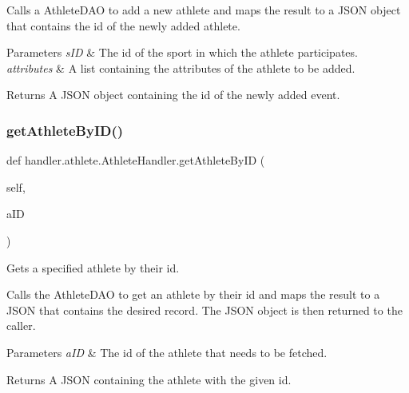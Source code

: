 Calls a Athlete\+D\+AO to add a new athlete and maps the result to a J\+S\+ON object that contains the id of the newly added athlete.


\begin{DoxyParams}{Parameters}
{\em s\+ID} & The id of the sport in which the athlete participates. \\
\hline
{\em attributes} & A list containing the attributes of the athlete to be added. \\
\hline
\end{DoxyParams}
\begin{DoxyReturn}{Returns}
A J\+S\+ON object containing the id of the newly added event. 
\end{DoxyReturn}
\mbox{\label{classhandler_1_1athlete_1_1_athlete_handler_a7261ed3d7231ef7bdb261863414be608}} 
\subsubsection{\texorpdfstring{get\+Athlete\+By\+I\+D()}{getAthleteByID()}}
{\footnotesize\ttfamily def handler.\+athlete.\+Athlete\+Handler.\+get\+Athlete\+By\+ID (\begin{DoxyParamCaption}\item[{}]{self,  }\item[{}]{a\+ID }\end{DoxyParamCaption})}



Gets a specified athlete by their id. 

Calls the Athlete\+D\+AO to get an athlete by their id and maps the result to a J\+S\+ON that contains the desired record. The J\+S\+ON object is then returned to the caller.


\begin{DoxyParams}{Parameters}
{\em a\+ID} & The id of the athlete that needs to be fetched.\\
\hline
\end{DoxyParams}
\begin{DoxyReturn}{Returns}
A J\+S\+ON containing the athlete with the given id. 
\end{DoxyReturn}
\mbox{\label{classhandler_1_1athlete_1_1_athlete_handler_af33bd416854d51f10a33aa264f1e3b2f}} 
